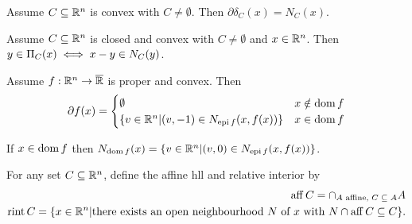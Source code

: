 \begin{thm}
  \label{sec:subgradients-6}
  Assume $C \subseteq \mathbb{R}^{n}$ is convex with $C \neq \emptyset$.  Then
  $\partial \delta_{C}(x) = N_{C}(x)$.
\end{thm}
\begin{thm}
  \label{sec:subgradients-7}
  Assume $C \subseteq \mathbb{R}^{n}$ is closed and convex with $C \neq
  \emptyset$ and $x \in \mathbb{R}^{n}$.  Then $y \in \operatorname*{\Pi}_{C}(x) \iff x - y
  \in N_{C}(y)$.
\end{thm}

\begin{thm}
  \label{sec:subgradients-8}
  Assume $f: \mathbb{R}^{n} \rightarrow \overline {\mathbb{R}}$ is proper and convex.
  Then
  \begin{equation}
    \label{eq:14}
    \partial f(x) =
    \begin{cases}
      \emptyset & x \notin \operatorname*{dom} f \\
      \{ v \in \mathbb{R}^{n} | (v, -1) \in N_{\operatorname*{epi} f}(x, f(x)) \} & x \in
      \operatorname*{dom} f
    \end{cases}
  \end{equation}

  If $x \in \operatorname*{dom} f$ then $N_{\operatorname*{dom} f}(x) = \{ v \in \mathbb{R}^{n} | (v, 0) \in
  N_{\operatorname*{epi} f}(x, f(x)) \} $.
\end{thm}

\begin{defn}
  \label{sec:subgradients-10}
  For any set $C \subseteq \mathbb{R}^{n}$, define the affine hll and relative
  interior by
  \begin{align}
    \label{eq:15}
    \operatorname*{aff} C = \cap_{\text{$A$ affine, $C \subseteq A$}} A \\
    \operatorname*{rint} C = \{ x \in \mathbb{R}^{n} | \text{there exists an open
      neighbourhood $N$ of $x$ with $N \cap \operatorname*{aff} C \subseteq C$} \}.
    \label{eq:16}
  \end{align}
\end{defn}

